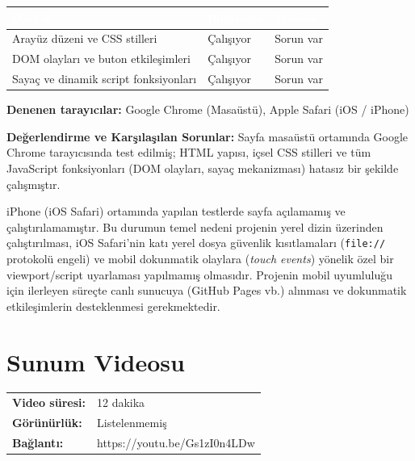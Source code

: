 \documentclass[12pt,a4paper]{article}
\begin{document}
\begin{center}
\begin{tabular}{@{}p{6cm}p{3.4cm}p{3.4cm}@{}}
\toprule
\rowcolor{ana}\textcolor{white}{\textbf{Özellik}} & \textcolor{white}{\textbf{Bilgisayar}} & \textcolor{white}{\textbf{Telefon}} \\
\midrule
Arayüz düzeni ve CSS stilleri & Çalışıyor & Sorun var \\
DOM olayları ve buton etkileşimleri & Çalışıyor & Sorun var \\
Sayaç ve dinamik script fonksiyonları & Çalışıyor & Sorun var \\
\bottomrule
\end{tabular}
\end{center}

\textbf{Denenen tarayıcılar:} Google Chrome (Masaüstü), Apple Safari (iOS / iPhone)

\vspace{0.5em}
\noindent\textbf{Değerlendirme ve Karşılaşılan Sorunlar:}\newline
Sayfa masaüstü ortamında Google Chrome tarayıcısında test edilmiş; HTML yapısı, içsel CSS stilleri ve tüm JavaScript fonksiyonları (DOM olayları, sayaç mekanizması) hatasız bir şekilde çalışmıştır. 

iPhone (iOS Safari) ortamında yapılan testlerde sayfa açılamamış ve çalıştırılamamıştır. Bu durumun temel nedeni projenin yerel dizin üzerinden çalıştırılması, iOS Safari'nin katı yerel dosya güvenlik kısıtlamaları (\texttt{file://} protokolü engeli) ve mobil dokunmatik olaylara (\textit{touch events}) yönelik özel bir viewport/script uyarlaması yapılmamış olmasıdır. Projenin mobil uyumluluğu için ilerleyen süreçte canlı sunucuya (GitHub Pages vb.) alınması ve dokunmatik etkileşimlerin desteklenmesi gerekmektedir.

\section{Sunum Videosu}
\begin{center}
\begin{tabular}{@{}ll@{}}
\textbf{Video süresi:} & 12 dakika\\
\textbf{Görünürlük:} & Listelenmemiş\\
\textbf{Bağlantı:} & https://youtu.be/Gs1zI0n4LDw\\
\end{tabular}
\end{center}
\end{document}
